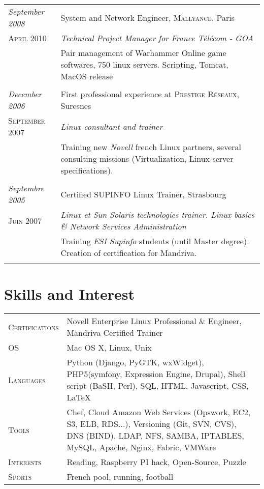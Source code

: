 \documentclass[a4paper,10pt]{article}
\begin{document}
\begin{tabular}{p{}|p{}}
 \emph{September 2008} & System and Network Engineer, \textsc{Mallyance}, Paris \\\textsc{April 2010}&\emph{Technical Project Manager for France Télécom - GOA}\\&\footnotesize{ Pair management of Warhammer Online game softwares, 750 linux servers. Scripting, Tomcat, MacOS release}\\\multicolumn{2}{c}{} \\

 \emph{December 2006} & First professional experience at \textsc{Prestige Réseaux}, Suresnes \\\textsc{September 2007}&\emph{Linux consultant and trainer}\\&\footnotesize{Training new \emph{Novell} french Linux partners, several consulting missions (Virtualization, Linux server specifications).}\\\multicolumn{2}{c}{} \\

 \emph{Septembre 2005} & Certified \textsc{SUPINFO} Linux Trainer, Strasbourg \\\textsc{Juin 2007}&\emph{Linux et Sun Solaris technologies trainer. Linux basics \& Network Services Administration}\\&\footnotesize{Training \emph{ESI Supinfo} students (until Master degree). Creation of certification for Mandriva.}\\\multicolumn{2}{c}{}
\end{tabular}

\section{Skills and Interest}
\begin{tabular}{p{}|p{}}	
\textsc{Certifications} & Novell Enterprise Linux Professional \& Engineer, Mandriva Certified Trainer\\
\textsc{OS} & Mac OS X, Linux, Unix\\
\textsc{Languages} & Python (Django, PyGTK, wxWidget), PHP5(symfony, Expression Engine, Drupal), Shell script (BaSH, Perl), SQL, HTML, Javascript, CSS, \LaTeX\\
\textsc{Tools} & Chef, Cloud Amazon Web Services (Opswork, EC2, S3, ELB, RDS...), Versioning (Git, SVN, CVS), DNS (BIND), LDAP, NFS, SAMBA, IPTABLES, MySQL, Apache, Nginx, Fabric, VMWare\\
\textsc{Interests} & Reading, Raspberry PI hack, Open-Source, Puzzle\\
\textsc{Sports} & French pool, running, football
\end{tabular}
\end{document}
